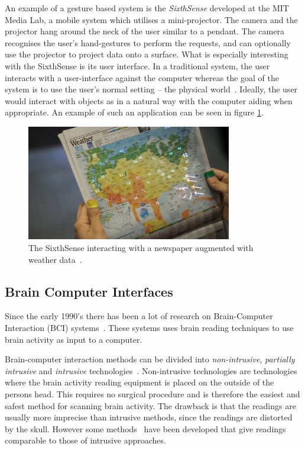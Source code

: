 An example of a gesture based system is the \emph{SixthSense} developed at the MIT Media Lab, a mobile system which utilises a mini-projector. The camera and the projector hang around the neck of the user similar to a pendant. The camera recognises the user's hand-gestures to perform the requests, and can optionally use the projector to project data onto a surface. What is especially interesting with the SixthSense is its user interface. In a traditional system, the user interacts with a user-interface against the computer whereas the goal of the system is to use the user's normal setting -- the physical world~\cite{Mistry:2009:SWG:1667146.1667160}. Ideally, the user would interact with objects as in a natural way with the computer aiding when appropriate. An example of such an application can be seen in figure \ref{sixthsense}.


\begin{figure}[]
\includegraphics[width=0.8\textwidth] {bilder/newspaper.jpg}
\caption{The SixthSense interacting with a newspaper augmented with weather data~\cite{newspaper}.}
\label{sixthsense}
\end{figure}


\subsection{Brain Computer Interfaces}

Since the early 1990's there has been a lot of research on Brain-Computer Interaction (BCI) systems~\cite{lebedev2006brain}. These systems uses brain reading techniques to use brain activity as input to a computer.

Brain-computer interaction methods can be divided into \emph{non-intrusive}, \emph{partially intrusive} and \emph{intrusive} technologies~\cite{legobrain}. Non-intrusive technologies are technologies where the brain activity reading equipment is placed on the outside of the persons head. This requires no surgical procedure and is therefore the easiest and safest method for scanning brain activity. The drawback is that the readings are usually more imprecise than intrusive methods, since the readings are distorted by the skull. However some methods~\cite{doud2011continuous} have been developed that give readings comparable to those of intrusive approaches.

